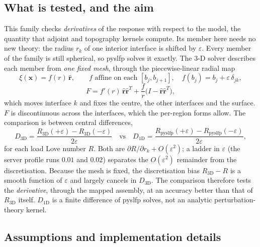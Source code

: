 \documentclass[11pt]{article}
\numberwithin{equation}{section}
\newcommand{\eps}{\varepsilon}
\newcommand{\vx}{\mathbf{x}}
\newcommand{\rhat}{\hat{\mathbf{r}}}
\begin{document}
\subsection{What is tested, and the aim}

This family checks \emph{derivatives} of the response with respect to the
model, the quantity that adjoint and topography kernels compute. Its
member here needs no new theory: the radius $r_k$ of one interior interface is
shifted by $\eps$. Every member of the family is still spherical, so
pyslfp solves it exactly. The 3-D solver describes each member from
\emph{one fixed mesh}, through the piecewise-linear radial map
\begin{equation}
  \xi(\vx) = f(r)\,\rhat,\qquad f \text{ affine on each } [b_j,b_{j+1}],\quad
  f(b_j) = b_j + \eps\,\delta_{jk},
  \label{eq:shift}
\end{equation}
\begin{equation*}
  F = f'(r)\,\rhat\rhat^T + \frac{f}{r}\bigl(I-\rhat\rhat^T\bigr),
\end{equation*}
which moves interface $k$ and fixes the centre, the other interfaces and
the surface. $F$ is discontinuous across the interfaces, which the
per-region forms allow. The comparison is between central differences,
\begin{equation}
  D_{3\text{D}} = \frac{R_{3\text{D}}(+\eps)-R_{3\text{D}}(-\eps)}{2\eps}
  \quad\text{vs}\quad
  D_{1\text{D}} = \frac{R_{\text{pyslfp}}(+\eps)-R_{\text{pyslfp}}(-\eps)}{2\eps},
  \label{eq:fd}
\end{equation}
for each load Love number $R$. Both are $\partial R/\partial r_k+O(\eps^2)$;
a ladder in $\eps$ (the server profile runs $0.01$ and $0.02$) separates
the $O(\eps^2)$ remainder from the discretisation. Because the mesh is
fixed, the discretisation bias $R_{3\text{D}}-R$ is a smooth function of
$\eps$ and largely cancels in $D_{3\text{D}}$. The comparison therefore
tests the \emph{derivative}, through the mapped assembly, at an accuracy
better than that of $R_{3\text{D}}$ itself. $D_{1\text{D}}$ is a finite
difference of pyslfp solves, not an analytic perturbation-theory kernel.

\subsection{Assumptions and implementation details}
\end{document}
